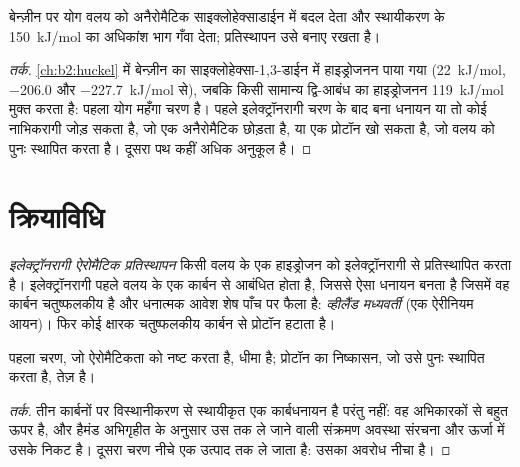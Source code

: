 \begin{proposition}[बेन्ज़ीन योग क्यों नहीं करती]\label{prop:b2:aromatic-substitution:no-addition}
बेन्ज़ीन पर योग  वलय को अनैरोमैटिक साइक्लोहेक्साडाईन में बदल देता और
 स्थायीकरण के \qty{150}{kJ/mol} का अधिकांश भाग गँवा देता; प्रतिस्थापन उसे बनाए रखता है।
\end{proposition}

\begin{proof}[तर्क]
\cref{ch:b2:huckel} में बेन्ज़ीन का साइक्लोहेक्सा-1,3-डाईन में हाइड्रोजनन
 पाया गया (\qty{+22}{kJ/mol}, \qty{-206.0}{} और \qty{-227.7}{kJ/mol} से), जबकि
किसी सामान्य द्वि-आबंध का हाइड्रोजनन \qty{119}{kJ/mol} मुक्त करता है: पहला योग महँगा चरण है।
पहले इलेक्ट्रॉनरागी चरण के बाद बना धनायन या तो कोई नाभिकरागी जोड़ सकता है, जो
एक अनैरोमैटिक  छोड़ता है, या एक प्रोटॉन खो सकता है, जो  वलय को पुनः स्थापित करता है। दूसरा
पथ कहीं अधिक अनुकूल है।
\end{proof}

\section{क्रियाविधि}

\begin{definition}[इलेक्ट्रॉनरागी ऐरोमैटिक प्रतिस्थापन]\label{def:b2:aromatic-substitution:seAr}
\emph{इलेक्ट्रॉनरागी ऐरोमैटिक प्रतिस्थापन}
किसी  वलय के एक हाइड्रोजन को इलेक्ट्रॉनरागी  से प्रतिस्थापित करता है। इलेक्ट्रॉनरागी पहले
वलय के एक कार्बन से आबंधित होता है, जिससे ऐसा धनायन बनता है जिसमें वह कार्बन चतुष्फलकीय है और
धनात्मक आवेश शेष पाँच पर फैला है: \emph{व्हीलैंड मध्यवर्ती}
(एक ऐरीनियम आयन)। फिर कोई क्षारक चतुष्फलकीय कार्बन से प्रोटॉन हटाता है।
\end{definition}

\begin{proposition}[दो चरण]\label{prop:b2:aromatic-substitution:mechanism}
पहला चरण, जो ऐरोमैटिकता को नष्ट करता है, धीमा है; प्रोटॉन का निष्कासन,
जो उसे पुनः स्थापित करता है, तेज़ है।
\end{proposition}

\begin{proof}[तर्क]
 तीन कार्बनों पर विस्थानीकरण से स्थायीकृत एक कार्बधनायन है
परंतु  नहीं: वह अभिकारकों से बहुत ऊपर है, और हैमंड अभिगृहीत के अनुसार
उस तक ले जाने वाली संक्रमण अवस्था संरचना और ऊर्जा में उसके निकट है। दूसरा चरण
नीचे एक  उत्पाद तक ले जाता है: उसका अवरोध नीचा है।
\end{proof}


